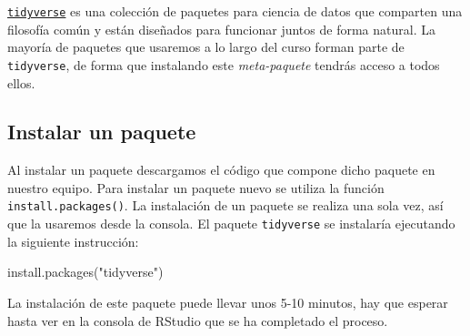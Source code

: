 \documentclass[
  title=normal,
  notoc,
  bib=normal]{mnye}
\newenvironment{Shaded}{\begin{snugshade}}{\end{snugshade}}
\newcommand{\FunctionTok}[1]{\textcolor[rgb]{0.00,0.00,0.00}{#1}}
\newcommand{\NormalTok}[1]{#1}
\newcommand{\StringTok}[1]{\textcolor[rgb]{0.31,0.60,0.02}{#1}}
\begin{document}
\href{https://www.tidyverse.org/}{\texttt{tidyverse}} es una colección de paquetes para ciencia de datos que comparten una filosofía común y están diseñados para funcionar juntos de forma natural.
La mayoría de paquetes que usaremos a lo largo del curso forman parte de \texttt{tidyverse}, de forma que instalando este \emph{meta-paquete} tendrás acceso a todos ellos.

\hypertarget{install}{%
\subsection{Instalar un paquete}\label{install}}

Al instalar un paquete descargamos el código que compone dicho paquete en nuestro equipo.
Para instalar un paquete nuevo se utiliza la función \texttt{install.packages()}. La instalación de un paquete se realiza una sola vez, así que la usaremos desde la consola. El paquete \texttt{tidyverse} se instalaría ejecutando la siguiente instrucción:

\begin{Shaded}
\begin{Highlighting}[]
\FunctionTok{install.packages}\NormalTok{(}\StringTok{"tidyverse"}\NormalTok{)}
\end{Highlighting}
\end{Shaded}

La instalación de este paquete puede llevar unos 5-10 minutos, hay que esperar hasta ver en la consola de \textsf{RStudio} que se ha completado el proceso.
\end{document}
